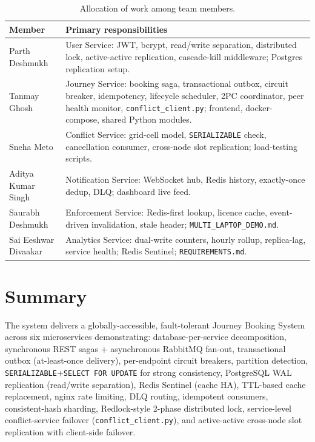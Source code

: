 \documentclass[11pt,a4paper]{article}
\begin{document}
\begin{table}[H]
    \centering\small
    \begin{tabularx}{\textwidth}{L{3.2cm} X}
        \toprule
        \textbf{Member} & \textbf{Primary responsibilities} \\
        \midrule
        Parth Deshmukh & User Service: JWT, bcrypt, read/write separation, distributed lock, active-active replication, cascade-kill middleware; Postgres replication setup. \\
        Tanmay Ghosh & Journey Service: booking saga, transactional outbox, circuit breaker, idempotency, lifecycle scheduler, 2PC coordinator, peer health monitor, \texttt{conflict\_client.py}; frontend, docker-compose, shared Python modules. \\
        Sneha Meto & Conflict Service: grid-cell model, \texttt{SERIALIZABLE} check, cancellation consumer, cross-node slot replication; load-testing scripts. \\
        Aditya Kumar Singh & Notification Service: WebSocket hub, Redis history, exactly-once dedup, DLQ; dashboard live feed. \\
        Saurabh Deshmukh & Enforcement Service: Redis-first lookup, licence cache, event-driven invalidation, stale header; \texttt{MULTI\_LAPTOP\_DEMO.md}. \\
        Sai Eeshwar Divaakar & Analytics Service: dual-write counters, hourly rollup, replica-lag, service health; Redis Sentinel; \texttt{REQUIREMENTS.md}. \\
        \bottomrule
    \end{tabularx}
    \caption{Allocation of work among team members.}
    \label{tab:work-allocation}
\end{table}
 
\section{Summary}
\label{sec:conclusion}

The system delivers a globally-accessible, fault-tolerant Journey Booking System across six microservices demonstrating: database-per-service decomposition, synchronous REST sagas + asynchronous RabbitMQ fan-out, transactional outbox (at-least-once delivery), per-endpoint circuit breakers, partition detection, \texttt{SERIALIZABLE}+\texttt{SELECT FOR UPDATE} for strong consistency, PostgreSQL WAL replication (read/write separation), Redis Sentinel (cache HA), TTL-based cache replacement, nginx rate limiting, DLQ routing, idempotent consumers, consistent-hash sharding, Redlock-style 2-phase distributed lock, service-level conflict-service failover (\texttt{conflict\_client.py}), and active-active cross-node slot replication with client-side failover.
\end{document}
